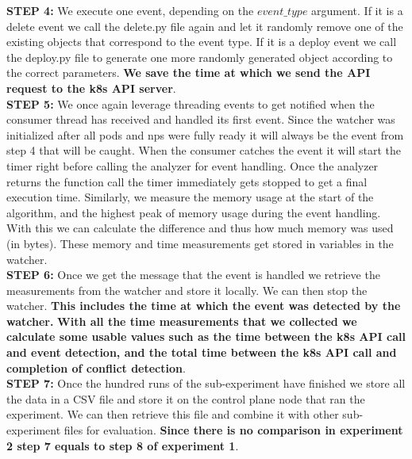 \textbf{STEP 4:} We execute one event, depending on the $event\_type$ argument. If it is a delete event we call the delete.py file again and let it randomly remove one of the existing objects that correspond to the event type. If it is a deploy event we call the deploy.py file to generate one more randomly generated object according to the correct parameters. \textbf{We save the time at which we send the API request to the \acrshort{k8s} API server}.
\\[10pt]

\textbf{STEP 5:} We once again leverage threading events to get notified when the consumer thread has received and handled its first event. Since the watcher was initialized after all pods and \acrshort{np}s were fully ready it will always be the event from step 4 that will be caught. When the consumer catches the event it will start the timer right before calling the analyzer for event handling. Once the analyzer returns the function call the timer immediately gets stopped to get a final execution time. Similarly, we measure the memory usage at the start of the algorithm, and the highest peak of memory usage during the event handling. With this we can calculate the difference and thus how much memory was used (in bytes). These memory and time measurements get stored in variables in the watcher.
\\[10pt]

\textbf{STEP 6:} Once we get the message that the event is handled we retrieve the measurements from the watcher and store it locally. We can then stop the watcher. 
\textbf{This includes the time at which the event was detected by the watcher.} \textbf{With all the time measurements that we collected we calculate some usable values such as the time between the \acrshort{k8s} API call and event detection, and the total time between the \acrshort{k8s} API call and completion of conflict detection}.
\\[10pt]

\textbf{STEP 7:} Once the hundred runs of the sub-experiment have finished we store all the data in a CSV file and store it on the control plane node that ran the experiment. We can then retrieve this file and combine it with other sub-experiment files for evaluation.  \textbf{Since there is no comparison in experiment 2 step 7 equals to step 8 of experiment 1}. 
\\[10pt]



